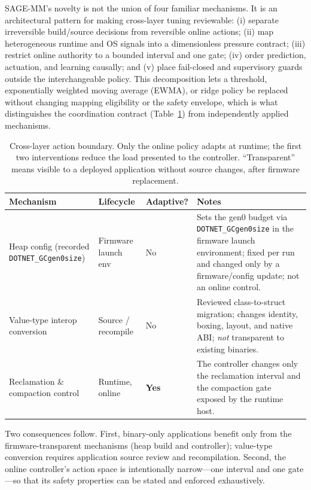 SAGE-MM's novelty is not the union of four familiar mechanisms. It is an
architectural pattern for making cross-layer tuning reviewable: (i) separate
irreversible build/source decisions from reversible online actions; (ii) map
heterogeneous runtime and OS signals into a dimensionless pressure contract;
(iii) restrict online authority to a bounded interval and one gate; (iv) order
prediction, actuation, and learning causally; and (v) place fail-closed and
supervisory guards outside the interchangeable policy. This decomposition lets
a threshold, exponentially weighted moving average (EWMA), or ridge policy be
replaced without changing mapping
eligibility or the safety envelope, which is what distinguishes the coordination
contract (Table~\ref{tab:boundary}) from independently applied mechanisms.

\begin{table}[t]
  \caption{Cross-layer action boundary. Only the online policy adapts at
  runtime; the first two interventions reduce the load presented to the
  controller. ``Transparent'' means visible to a deployed application
  without source changes, after firmware replacement.}
  \label{tab:boundary}
  \small
  \begin{tabular}{@{}p{3.1cm}p{2.4cm}p{2.0cm}p{\dimexpr\textwidth-7.5cm-6\tabcolsep\relax}@{}}
    \toprule
    \textbf{Mechanism} & \textbf{Lifecycle} & \textbf{Adaptive?} &
    \textbf{Notes} \\
    \midrule
    Heap config
    (recorded \texttt{DOTNET\_\allowbreak GCgen0size}) &
    Firmware launch env & No &
    Sets the gen0 budget via \texttt{DOTNET\_GCgen0size} in the firmware launch
    environment; fixed per run and changed only by a firmware/config update;
    not an online control. \\
    Value-type interop conversion &
    Source / recompile & No &
    Reviewed class-to-struct migration; changes identity, boxing, layout,
    and native ABI; \emph{not} transparent to existing binaries. \\
    Reclamation \& compaction control &
    Runtime, online & \textbf{Yes} &
    The controller changes only the reclamation interval and the compaction
    gate exposed by the runtime host. \\
    \bottomrule
  \end{tabular}
\end{table}

Two consequences follow. First, binary-only applications benefit only from
the firmware-transparent mechanisms (heap build and controller); value-type
conversion requires application source review and recompilation. Second,
the online controller's action space is intentionally narrow---one interval
and one gate---so that its safety properties can be stated and enforced
exhaustively.

